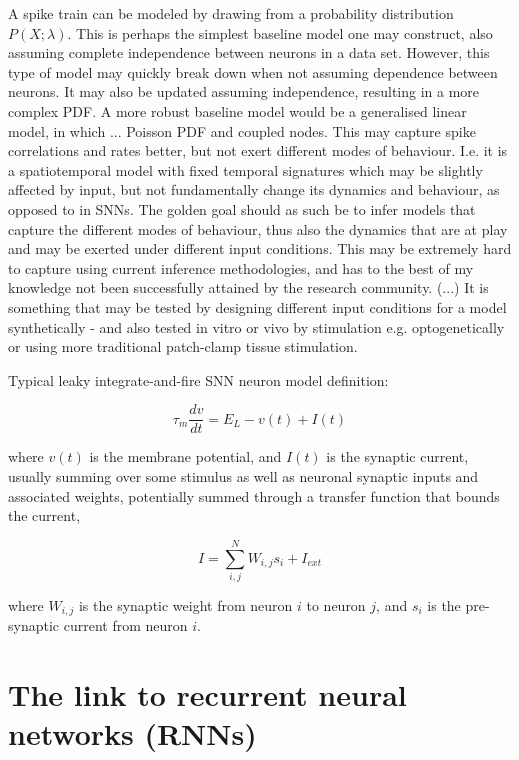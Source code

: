 \documentclass[mphil,deptreport,ai]{infthesis} %
\begin{document}
A spike train can be modeled by drawing from a probability distribution $P(X; \lambda)$.
This is perhaps the simplest baseline model one may construct, also assuming complete independence between neurons in a data set.
However, this type of model may quickly break down when not assuming dependence between neurons.
It may also be updated assuming independence, resulting in a more complex PDF.
A more robust baseline model would be a generalised linear model, in which ... Poisson PDF and coupled nodes.
This may capture spike correlations and rates better, but not exert different modes of behaviour.
I.e. it is a spatiotemporal model with fixed temporal signatures which may be slightly affected by input, but not fundamentally change its dynamics and behaviour, as opposed to in SNNs.
The golden goal should as such be to infer models that capture the different modes of behaviour, thus also the dynamics that are at play and may be exerted under different input conditions.
This may be extremely hard to capture using current inference methodologies, and has to the best of my knowledge not been successfully attained by the research community.
(...)
It is something that may be tested by designing different input conditions for a model synthetically - and also tested in vitro or vivo by stimulation e.g. optogenetically or using more traditional patch-clamp tissue stimulation.

Typical leaky integrate-and-fire SNN neuron model definition:

\begin{equation}
    \tau_m \frac{dv}{dt} = E_L - v(t) + I(t)
\end{equation}

where $v(t)$ is the membrane potential, and $I(t)$ is the synaptic current, usually summing over some stimulus as well as neuronal synaptic inputs and associated weights, potentially summed through a transfer function that bounds the current,

\begin{equation}
    I = \sum_{i,j}^{N} W_{i,j} s_i + I_{ext}
\end{equation}

where $W_{i,j}$ is the synaptic weight from neuron $i$ to neuron $j$, and $s_i$ is the pre-synaptic current from neuron $i$.

\section{The link to recurrent neural networks (RNNs)}
\end{document}
